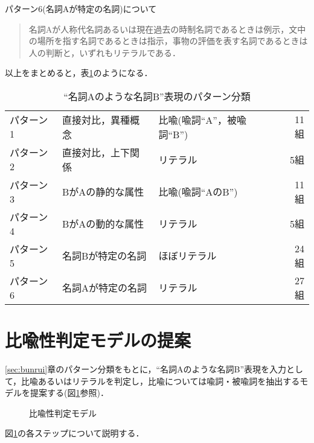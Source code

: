 \medskip
パターン6(名詞Aが特定の名詞)について
\begin{quote}
名詞Aが人称代名詞あるいは現在過去の時制名詞であるときは例示，文中の場所を指す名詞であるときは指示，事物の評価を表す名詞であるときは人の判断と，いずれもリテラルである．
\end{quote}

\medskip
以上をまとめると，表\ref{tab:noyouna3}のようになる．

\begin{table}[htbp]
	\caption{``名詞Aのような名詞B''表現のパターン分類}
	\begin{center}
	\begin{tabular}{|l|l|l|r|}
		\hline
		パターン1 & 直接対比，異種概念 & 比喩(喩詞``A''，被喩詞``B'') & 11組 \\
		パターン2 & 直接対比，上下関係 & リテラル & 5組 \\
		パターン3 & BがAの静的な属性 & 比喩(喩詞``AのB'') & 11組 \\
		パターン4 & BがAの動的な属性 & リテラル & 5組 \\
		パターン5 & 名詞Bが特定の名詞 &ほぼリテラル & 24組 \\
		パターン6 & 名詞Aが特定の名詞 & リテラル & 27組 \\
		\hline
	\end{tabular}
	\end{center}
	\label{tab:noyouna3}
\end{table}

\section{比喩性判定モデルの提案}\label{sec:teian}

\ref{sec:bunrui}章のパターン分類をもとに，``名詞Aのような名詞B''表現を入力として，比喩あるいはリテラルを判定し，比喩については喩詞・被喩詞を抽出するモデルを提案する(図\ref{fig:hantei_moderu}参照)．


\begin{figure}[htbp]
\begin{center}
 \leavevmode
\vspace*{5mm}
 \epsfxsize=14cm
 \epsfysize=14.466cm
 \caption{比喩性判定モデル}
 \label{fig:hantei_moderu}
\vspace*{5mm}
\end{center}
\end{figure}

図\ref{fig:hantei_moderu}の各ステップについて説明する．

